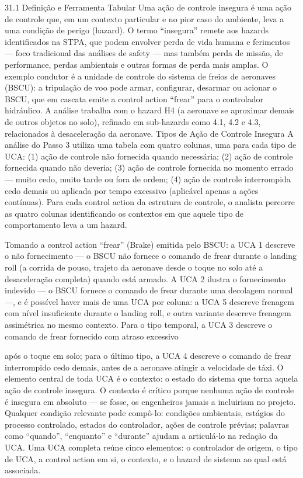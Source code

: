 31.1 Definição e Ferramenta Tabular Uma ação de controle insegura é uma ação de controle que, em um contexto particular e no pior caso do ambiente, leva a uma condição de perigo (hazard). O termo “insegura” remete aos hazards identificados na STPA, que podem envolver perda de vida humana e ferimentos — foco tradicional das análises de safety — mas também perda de missão, de performance, perdas ambientais e outras formas de perda mais amplas. O exemplo condutor é a unidade de controle do sistema de freios de aeronaves (BSCU): a tripulação de voo pode armar, configurar, desarmar ou acionar o BSCU, que em cascata emite a control action “frear” para o controlador hidráulico. A análise trabalha com o hazard H4 (a aeronave se aproximar demais de outros objetos no solo), refinado em sub-hazards como 4.1, 4.2 e 4.3, relacionados à desaceleração da aeronave. Tipos de Ação de Controle Insegura A análise do Passo 3 utiliza uma tabela com quatro colunas, uma para cada tipo de UCA: (1) ação de controle não fornecida quando necessária; (2) ação de controle fornecida quando não deveria; (3) ação de controle fornecida no momento errado — muito cedo, muito tarde ou fora de ordem; (4) ação de controle interrompida cedo demais ou aplicada por tempo excessivo (aplicável apenas a ações contínuas). Para cada control action da estrutura de controle, o analista percorre as quatro colunas identificando os contextos em que aquele tipo de comportamento leva a um hazard.

Tomando a control action “frear” (Brake) emitida pelo BSCU: a UCA 1 descreve o não fornecimento — o BSCU não fornece o comando de frear durante o landing roll (a corrida de pouso, trajeto da aeronave desde o toque no solo até a desaceleração completa) quando está armado. A UCA 2 ilustra o fornecimento indevido — o BSCU fornece o comando de frear durante uma decolagem normal —, e é possível haver mais de uma UCA por coluna: a UCA 5 descreve frenagem com nível insuficiente durante o landing roll, e outra variante descreve frenagem assimétrica no mesmo contexto. Para o tipo temporal, a UCA 3 descreve o comando de frear fornecido com atraso excessivo

após o toque em solo; para o último tipo, a UCA 4 descreve o comando de frear interrompido cedo demais, antes de a aeronave atingir a velocidade de táxi. O elemento central de toda UCA é o contexto: o estado do sistema que torna aquela ação de controle insegura. O contexto é crítico porque nenhuma ação de controle é insegura em absoluto — se fosse, os engenheiros jamais a incluiriam no projeto. Qualquer condição relevante pode compô-lo: condições ambientais, estágios do processo controlado, estados do controlador, ações de controle prévias; palavras como “quando”, “enquanto” e “durante” ajudam a articulá-lo na redação da UCA. Uma UCA completa reúne cinco elementos: o controlador de origem, o tipo de UCA, a control action em si, o contexto, e o hazard de sistema ao qual está associada.

